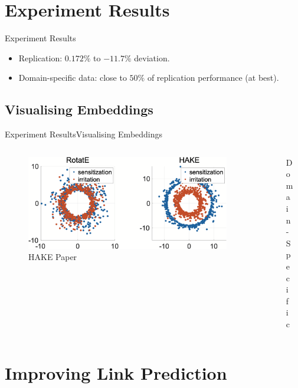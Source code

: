 \documentclass[10pt, aspectratio = 1610, hide notes]{beamer}
\begin{document}
\section{Experiment Results}
\begin{frame}{Experiment Results}
  \begin{itemize}[<+->]
    \item Replication: $0.172\%$ to $-11.7\%$ deviation.
    \item Domain-specific data: close to $50\%$ of replication performance (at best).
  \end{itemize}
\end{frame}

\subsection{Visualising Embeddings}
\begin{frame}{Experiment Results}{Visualising Embeddings}
  \begin{columns}[b]
    \begin{column}{0.5 \textwidth}
      \begin{figure}
        \centering
        \includegraphics[width = 1 \textwidth]{figures/hake-plots.png}
        \caption{HAKE Paper}
      \end{figure}
    \end{column}

    \begin{column}{0.5 \textwidth}
      \begin{figure}
        \centering
        
        \caption{Domain-Specific}
      \end{figure}
    \end{column}
  \end{columns}
\end{frame}

\section{Improving Link Prediction}
\end{document}
